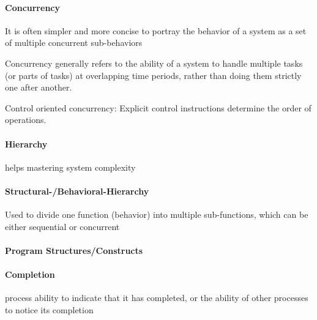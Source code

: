 \documentclass[english]{latex4ei/latex4ei_sheet}
\begin{document}
\paragraph{Concurrency}
It is often simpler and more concise to portray the behavior of a system as a set of multiple concurrent sub-behaviors

Concurrency generally refers to the ability of a system to handle multiple tasks (or parts of tasks) at overlapping time periods, rather than doing them strictly one after another.

Control oriented concurrency: Explicit control instructions determine the order of operations.

\paragraph{Hierarchy} helps mastering system complexity

\paragraph{Structural-/Behavioral-Hierarchy} Used to divide one function (behavior) into multiple sub-functions, which can be either sequential or concurrent

\paragraph{Program Structures/Constructs}

\paragraph{Completion} process ability to indicate that it has completed, or the ability of other processes to notice its completion
\end{document}
